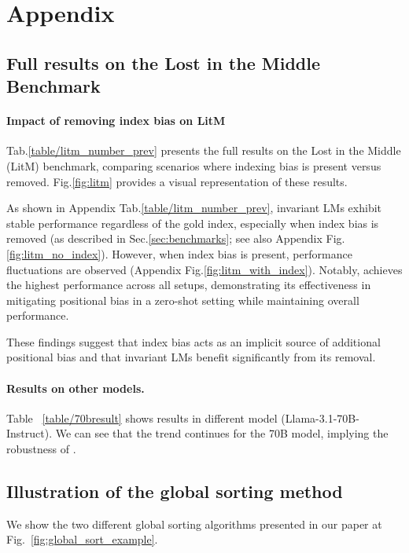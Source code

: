 
\onecolumn
\section{Appendix}\label{sec:appendix}

\subsection{Full results on the Lost in the Middle Benchmark}
\label{appendix:litm_detail}



\paragraph{Impact of removing index bias on LitM}
Tab.\ref{table/litm_number_prev} presents the full results on the Lost in the Middle (LitM) benchmark, comparing scenarios where indexing bias is present versus removed. Fig.\ref{fig:litm} provides a visual representation of these results.

As shown in Appendix Tab.\ref{table/litm_number_prev}, invariant LMs exhibit stable performance regardless of the gold index, especially when index bias is removed (as described in Sec.\ref{sec:benchmarks}; see also Appendix Fig.\ref{fig:litm_no_index}). However, when index bias is present, performance fluctuations are observed (Appendix Fig.\ref{fig:litm_with_index}). Notably, \ours{} achieves the highest performance across all setups, demonstrating its effectiveness in mitigating positional bias in a zero-shot setting while maintaining overall performance.

These findings suggest that index bias acts as an implicit source of additional positional bias and that invariant LMs benefit significantly from its removal.
\paragraph{Results on other models.}
Table ~\ref{table/70bresult} shows results in different model (Llama-3.1-70B-Instruct). We can see that the trend continues for the 70B model, implying the robustness of \ours{}.


\subsection{Illustration of the global sorting method}

We show the two different global sorting algorithms presented in our paper at Fig.~\ref{fig:global_sort_example}.

